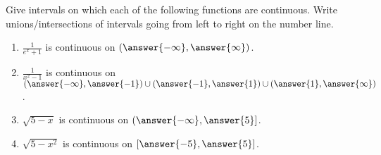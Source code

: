 \documentclass{ximera}
\author{Gregory Hartman \and Matthew Carr}
\begin{document}
\begin{exercise}




Give intervals on which each of the following functions are continuous. Write unions/intersections of intervals going from left to right on the number line.

\begin{enumerate}
\item		$\frac{1}{e^x+1}$ is continuous on $(\answer{-\infty},\answer{\infty})$.
\item		$\frac{1}{x^2-1}$ is continuous on $(\answer{-\infty},\answer{-1})\cup(\answer{-1},\answer{1})\cup(\answer{1},\answer{\infty})$.
\item		$\sqrt{5-x}$ is continuous on $(\answer{-\infty},\answer{5}]$.
\item		$\sqrt{5-x^2}$ is continuous on $[\answer{-5},\answer{5}]$.
\end{enumerate}

\end{exercise}
\end{document}
